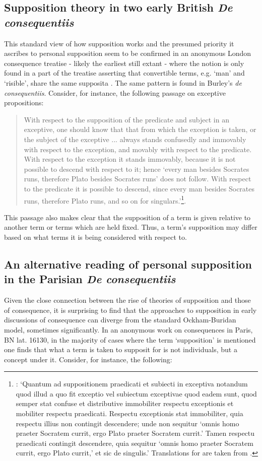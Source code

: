\documentclass[a4paper, 11pt]{article}
\begin{document}
\subsection{Supposition theory in two early British \emph{De consequentiis}}
This standard view of how supposition works and the presumed priority it ascribes to personal supposition seem to be confirmed in an anonymous London consequence treatise - likely the earliest still extant - where the notion is only found in a part of the treatise asserting that convertible terms, e.g. `man' and `risible', share the same supposita \autocite[9, par. 27]{Green-Pedersen1980a}. The same pattern is found in Burley's \emph{de consequentiis}. Consider, for instance, the following passage on exceptive propositions:
\begin{quote}
With respect to the supposition of the predicate and subject in an exceptive, one should know that that from which the exception is taken, or the subject of the exceptive ... always stands confusedly and immovably with respect to the exception, and movably with respect to the predicate. With respect to the exception it stands immovably, because it is not possible to descend with respect to it; hence `every man besides Socrates runs, therefore Plato besides Socrates runs' does not follow. With respect to the predicate it is possible to descend, since every man besides Socrates runs, therefore Plato runs, and so on for singulars.'\footnote{\autocite[124, par. 58]{Green-Pedersen1980b}: `Quantum ad suppositionem praedicati et subiecti in exceptiva notandum quod illud a quo fit exceptio vel subiectum exceptivae quod eadem sunt, quod semper stat confuse et distributive immobiliter respectu exceptionis et mobiliter respectu praedicati. Respectu exceptionis stat immobiliter, quia respectu illius non contingit descendere; unde non sequitur `omnis homo praeter Socratem currit, ergo Plato praeter Socratem currit.' Tamen respectu praedicati contingit descendere, quia sequitur `omnis homo praeter Socratem currit, ergo Plato currit,' et sic de singulis.' Translations for \autocite{Green-Pedersen1980a,Green-Pedersen1980b} are taken from \autocite[171-273]{Archambault2017d}.}.
\end{quote}
This passage also makes clear that the supposition of a term is given relative to another term or terms which are held fixed. Thus, a term's supposition may differ based on what terms it is being considered with respect to.

\subsection{An alternative reading of personal supposition in the Parisian \emph{De consequentiis}}
Given the close connection between the rise of theories of supposition and those of consequence, it is surprising to find that the approaches to supposition in early discussions of consequence can diverge from the standard Ockham-Buridan model, sometimes significantly. In an anonymous work on consequences in Paris, BN lat. 16130, in the majority of cases where the term `supposition' is mentioned one finds that what a term is taken to supposit for is not individuals, but a concept under it. Consider, for instance, the following:
\end{document}
